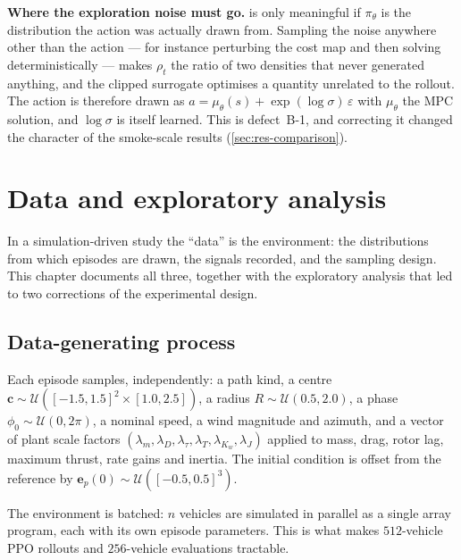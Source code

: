 \documentclass[11pt,a4paper,twoside,openright]{report}
\renewcommand{\vec}[1]{\bm{#1}}
\theoremstyle{plain}
\theoremstyle{definition}
\theoremstyle{remark}
\DeclareRobustCommand{\nbd}{\mbox{-}}
\begin{document}
	\begin{cautionbox}
		\textbf{Where the exploration noise must go.}  is only meaningful
		if $\pi_\theta$ is the distribution the action was actually drawn from. Sampling
		the noise anywhere other than the action --- for instance perturbing the cost
		map and then solving deterministically --- makes $\rho_t$ the ratio of two
		densities that never generated anything, and the clipped surrogate optimises a
		quantity unrelated to the rollout. The action is therefore drawn as
		$a=\mu_\theta(s)+\exp(\log\sigma)\,\varepsilon$ with $\mu_\theta$ the MPC
		solution, and $\log\sigma$ is itself learned. This is defect~B\nbd 1,
		and correcting it changed the character of the smoke-scale results
		(\cref{sec:res-comparison}).
	\end{cautionbox}

	\chapter{Data and exploratory analysis}
	\label{ch:data}

	In a simulation-driven study the ``data'' is the environment: the distributions
	from which episodes are drawn, the signals recorded, and the sampling design.
	This chapter documents all three, together with the exploratory analysis that
	led to two corrections of the experimental design.

	\section{Data-generating process}

	Each episode samples, independently: a path kind, a centre
	$\vec c\sim\mathcal U([-1.5,1.5]^2\times[1.0,2.5])$, a radius
	$R\sim\mathcal U(0.5,2.0)$, a phase $\phi_0\sim\mathcal U(0,2\pi)$, a nominal
	speed, a wind magnitude and azimuth, and a vector of plant scale factors
	$(\lambda_m,\lambda_D,\lambda_\tau,\lambda_{T},\lambda_{K_w},\lambda_J)$ applied
	to mass, drag, rotor lag, maximum thrust, rate gains and inertia. The initial
	condition is offset from the reference by
	$\vec e_p(0)\sim\mathcal U([-0.5,0.5]^3)$.

	The environment is batched: $n$ vehicles are simulated in parallel as a single
	array program, each with its own episode parameters. This is what makes
	$\num{512}$-vehicle PPO rollouts and $\num{256}$-vehicle evaluations tractable.
\end{document}
